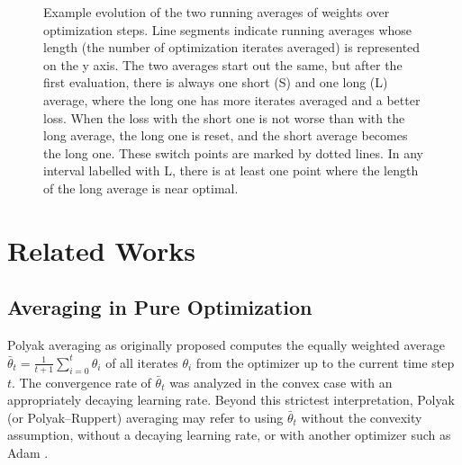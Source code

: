\documentclass[twocolumn]{article}
\begin{document}
\begin{figure}
\centering
{}
\caption[Example evolution of the two running averages of weights over optimization steps.]{Example evolution of the two running averages of weights over optimization steps.
Line segments indicate running averages whose length (the number of optimization iterates averaged) is represented on the y axis.
The two averages start out the same, but after the first evaluation, there is always one short (S) and one long (L) average, where the long one has more iterates averaged and a better loss.
When the loss with the short one is not worse than with the long average, the long one is reset, and the short average becomes the long one.
These switch points are marked by dotted lines.
In any interval labelled with L, there is at least one point where the length of the long average is near optimal.}
\label{fig:schematic}
\end{figure}


\section{Related Works}

\subsection{Averaging in Pure Optimization}

Polyak averaging as originally proposed \citep{ruppert1988efficient,polyak1992acceleration} computes the equally weighted average
$\bar{\theta}_t = \frac{1}{t+1}\sum_{i=0}^{t}\theta_i$
of all iterates $\theta_i$ from the optimizer up to the current time step $t$.
The convergence rate of $\bar{\theta}_t$ was analyzed in the convex case with an appropriately decaying learning rate.
Beyond this strictest interpretation, Polyak (or Polyak--Ruppert) averaging may refer to using $\bar{\theta}_t$ without the convexity assumption, without a decaying learning rate, or with another optimizer such as Adam \citep{kingma2014adam}.
\end{document}
